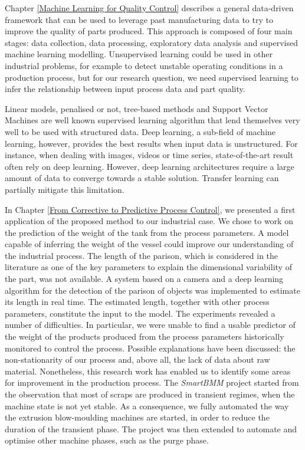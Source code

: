 Chapter \ref{Machine Learning for Quality Control} describes a general data-driven framework that can be used to leverage past manufacturing data to try to improve the quality of parts produced. This approach is composed of four main stages: data collection, data processing, exploratory data analysis and supervised machine learning modelling. Unsupervised learning could be used in other industrial problems, for example to detect unstable operating conditions in a production process, but for our research question, we need supervised learning to infer the relationship between input process data and part quality.

Linear models, penalised or not, tree-based methods and Support Vector Machines are well known supervised learning algorithm that lend themselves very well to be used with structured data. Deep learning, a sub-field of machine learning, however, provides the best results when input data is unstructured. For instance, when dealing with images, videos or time series, state-of-the-art result often rely on deep learning. However, deep learning architectures require a large amount of data to converge towards a stable solution. Transfer learning can partially mitigate this limitation.

In Chapter \ref{From Corrective to Predictive Process Control}, we presented a first application of the proposed method to our industrial case. We chose to work on the prediction of the weight of the tank from the process parameters. A model capable of inferring the weight of the vessel could improve our understanding of the industrial process. The length of the parison, which is considered in the literature as one of the key parameters to explain the dimensional variability of the part, was not available. A system based on a camera and a deep learning algorithm for the detection of the parison of objects was implemented to estimate its length in real time. The estimated length, together with other process parameters, constitute the input to the model. The experiments revealed a number of difficulties. In particular, we were unable to find a usable predictor of the weight of the products produced from the process parameters historically monitored to control the process. Possible explanations have been discussed: the non-stationarity of our process and, above all, the lack of data about raw material. Nonetheless, this research work has enabled us to identify some areas for improvement in the production process. The \textit{SmartBMM} project started from the observation that most of scraps are produced in transient regimes, when the machine state is not yet stable. As a consequence, we fully automated the way the extrusion blow-moulding machines are started, in order to reduce the duration of the transient phase. The project was then extended to automate and optimise other machine phases, such as the purge phase.

